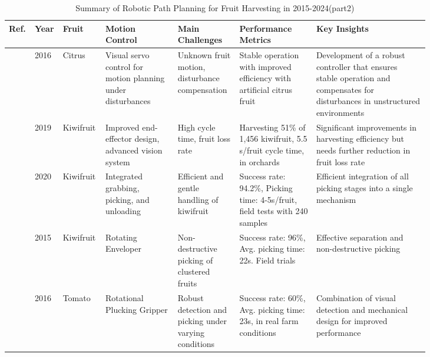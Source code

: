 \documentclass[a4paper,fleqn]{cas-dc}
\begin{document}
\begin{table} 
	\centering
	\footnotesize 
	\addtocounter{table}{-1} 
	\caption{Summary of Robotic Path Planning for Fruit Harvesting in 2015-2024(part2)} 
	\begin{tabular}{p{0.025\linewidth} p{0.025\linewidth} p{0.055\linewidth} p{0.16\linewidth} p{0.135\linewidth} p{0.175\linewidth} p{0.255\linewidth}}
\toprule
\textbf{Ref.} & \textbf{Year} & \textbf{Fruit} & \textbf{Motion Control} & \textbf{Main Challenges} & \textbf{Performance Metrics} & \textbf{Key Insights} \\ \midrule


\cite{mehta2016robust} & 2016 & Citrus & Visual servo control for motion planning under disturbances & Unknown fruit motion, disturbance compensation & Stable operation with improved efficiency with artificial citrus fruit & Development of a robust controller that ensures stable operation and compensates for disturbances in unstructured environments \\ \midrule
\cite{williams2020improvements} & 2019 & Kiwifruit & Improved end-effector design, advanced vision system & High cycle time, fruit loss rate & Harvesting 51\% of 1,456 kiwifruit, 5.5 s/fruit cycle time, in orchards & Significant improvements in harvesting efficiency but needs further reduction in fruit loss rate \\ \midrule
\cite{mu2020design} & 2020 & Kiwifruit & Integrated grabbing, picking, and unloading & Efficient and gentle handling of kiwifruit & Success rate: 94.2\%, Picking time: 4-5s/fruit, field tests with 240 samples & Efficient integration of all picking stages into a single mechanism \\ \midrule
\cite{longsheng2015development} & 2015 & Kiwifruit & Rotating Enveloper & Non-destructive picking of clustered fruits & Success rate: 96\%, Avg. picking time: 22s. Field trials & Effective separation and non-destructive picking \\ \midrule
\cite{yaguchi2016development} & 2016 & Tomato & Rotational Plucking Gripper & Robust detection and picking under varying conditions & Success rate: 60\%, Avg. picking time: 23s, in real farm conditions & Combination of visual detection and mechanical design for improved performance \\
\bottomrule
\end{tabular}
\end{table}
\fi
\end{document}
